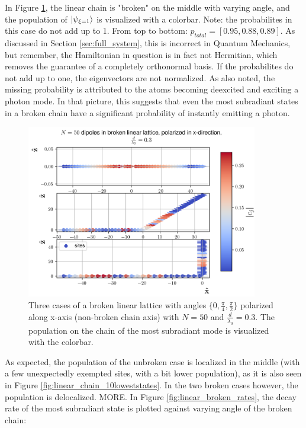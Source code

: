 \documentclass{article}
\begin{document}
In Figure \ref{fig:linear_broken}, the linear chain is "broken" on the middle with varying angle, and the population of $\ket{\psi_{\xi=1}}$ is visualized with a colorbar. Note: the probabilites in this case do not add up to 1. From top to bottom: $p_{total} = [0.95, 0.88, 0.89]$. As discussed in Section \ref{sec:full_system}, this is incorrect in Quantum Mechanics, but remember, the Hamiltonian in question is in fact not Hermitian, which removes the guarantee of a completely orthonormal basis. If the probabilites do not add up to one, the eigenvectors are not normalized. As also noted, the missing probability is attributed to the atoms becoming deexcited and exciting a photon mode. In that picture, this suggests that even the most subradiant states in a broken chain have a significant probability of instantly emitting a photon. 
\begin{figure}[H]
    \includegraphics[width=0.9\textwidth]{figs/dipoles_case_linear_broken.png}
    \caption{Three cases of a broken linear lattice with angles $\{0, \frac{\pi}{4}, \frac{\pi}{2}\}$ polarized along x-axis (non-broken chain axis) with $N = 50$ and $\frac{d}{\lambda_0} = 0.3$. The population on the chain of the most subradiant mode is visualized with the colorbar.}
    \label{fig:linear_broken}
\end{figure}
As expected, the population of the unbroken case is localized in the middle (with a few unexpectedly exempted sites, with a bit lower population), as it is also seen in Figure \ref{fig:linear_chain_10loweststates}. In the two broken cases however, the population is delocalized. MORE. In Figure \ref{fig:linear_broken_rates}, the decay rate of the most subradiant state is plotted against varying angle of the broken chain:
\end{document}
